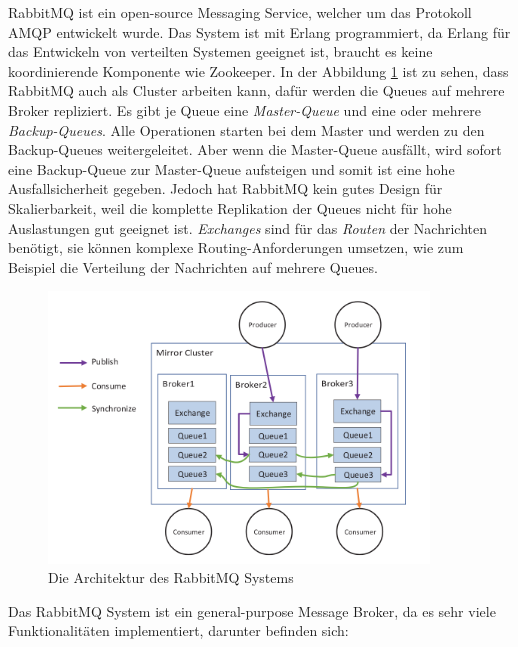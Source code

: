 RabbitMQ ist ein open-source Messaging Service, welcher um das Protokoll AMQP entwickelt wurde. Das System ist mit Erlang programmiert, da Erlang für das Entwickeln von verteilten Systemen geeignet ist, braucht es keine koordinierende Komponente wie Zookeeper. In der Abbildung \ref{fig:rabbitMQArchfairComparisonMessagingSystems} ist zu sehen, dass RabbitMQ auch als Cluster arbeiten kann, dafür werden die Queues auf mehrere Broker repliziert. Es gibt je Queue eine \emph{Master-Queue} und eine oder mehrere \emph{Backup-Queues}. Alle Operationen starten bei dem Master und werden zu den Backup-Queues weitergeleitet. Aber wenn die Master-Queue ausfällt, wird sofort eine Backup-Queue zur Master-Queue aufsteigen und somit ist eine hohe Ausfallsicherheit gegeben. Jedoch hat RabbitMQ kein gutes Design für Skalierbarkeit, weil die komplette Replikation der Queues nicht für hohe Auslastungen gut geeignet ist. \emph{Exchanges} sind für das \emph{Routen} der Nachrichten benötigt, sie können komplexe Routing-Anforderungen umsetzen, wie zum Beispiel die Verteilung der Nachrichten auf mehrere Queues. \cite{toshevLearningRabbitMQBuild2016}

\begin{figure}
    \centering
    \includegraphics[width=0.9\textwidth]{content/img/Research/Message_Services/rabbitMQArchfairComparisonMessagingSystems.png}
    \caption{Die Architektur des RabbitMQ Systems \cite{fuFairComparisonMessage2021}}
    \label{fig:rabbitMQArchfairComparisonMessagingSystems}
\end{figure}
\FloatBarrier

Das RabbitMQ System ist ein general-purpose Message Broker, da es sehr viele Funktionalitäten implementiert, darunter befinden sich: \cite{toshevLearningRabbitMQBuild2016}

